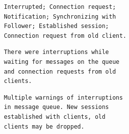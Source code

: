 \documentclass[conference]{IEEEtran}
\begin{document}
\begin{figure}
\begin{subfigure}{\textwidth}
\begin{subfigure}[t]{0.5\textwidth}
\begin{lstlisting}[numbers=none, caption=ChatGPT 4 Summary (with similar logs/summaries provided in prompt), label={lst:gpt4-embed-summary}]
Interrupted; Connection request; Notification; Synchronizing with Follower; Established session; Connection request from old client.
\end{lstlisting}
\end{subfigure}
\begin{subfigure}[t]{0.5\textwidth}
\begin{lstlisting}[numbers=none, caption=ChatGPT 3.5 Summary (without similar logs/summaries provided in prompt), label={lst:gpt3-no-embed-summary}]
There were interruptions while waiting for messages on the queue and connection requests from old clients.
\end{lstlisting}

\begin{lstlisting}[numbers=none, caption=ChatGPT 4 Summary (without similar logs/summaries provided in prompt), label={lst:gpt4-no-embed-summary}]
Multiple warnings of interruptions in message queue. New sessions established with clients, old clients may be dropped.
\end{lstlisting}
\end{subfigure}
    
\end{subfigure}
    
\end{figure}
\end{document}

